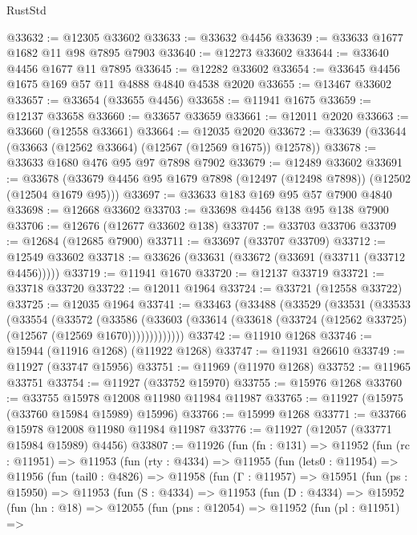 \begin{lexlean}{RustStd}
\begin{coremodule}
@33632 := @12305 @33602
@33633 := @33632 @4456
@33639 := @33633 @1677 @1682 @11 @98 @7895 @7903
@33640 := @12273 @33602
@33644 := @33640 @4456 @1677 @11 @7895
@33645 := @12282 @33602
@33654 := @33645 @4456 @1675 @169 @57 @11 @4888 @4840 @4538 @2020
@33655 := @13467 @33602
@33657 := @33654 (@33655 @4456)
@33658 := @11941 @1675
@33659 := @12137 @33658
@33660 := @33657 @33659
@33661 := @12011 @2020
@33663 := @33660 (@12558 @33661)
@33664 := @12035 @2020
@33672 := @33639 (@33644 (@33663 (@12562 @33664) (@12567 (@12569 @1675)) @12578))
@33678 := @33633 @1680 @476 @95 @97 @7898 @7902
@33679 := @12489 @33602
@33691 := @33678 (@33679 @4456 @95 @1679 @7898 (@12497 (@12498 @7898)) (@12502 (@12504 @1679 @95)))
@33697 := @33633 @183 @169 @95 @57 @7900 @4840
@33698 := @12668 @33602
@33703 := @33698 @4456 @138 @95 @138 @7900
@33706 := @12676 (@12677 @33602 @138)
@33707 := @33703 @33706
@33709 := @12684 (@12685 @7900)
@33711 := @33697 (@33707 @33709)
@33712 := @12549 @33602
@33718 := @33626 (@33631 (@33672 (@33691 (@33711 (@33712 @4456)))))
@33719 := @11941 @1670
@33720 := @12137 @33719
@33721 := @33718 @33720
@33722 := @12011 @1964
@33724 := @33721 (@12558 @33722)
@33725 := @12035 @1964
@33741 := @33463
    (@33488
      (@33529
        (@33531
          (@33533
            (@33554
              (@33572
                (@33586
                  (@33603 (@33614 (@33618 (@33724 (@12562 @33725) (@12567 (@12569 @1670)))))))))))))
@33742 := @11910 @1268
@33746 := @15944 (@11916 @1268) (@11922 @1268)
@33747 := @11931 @26610
@33749 := @11927 (@33747 @15956)
@33751 := @11969 (@11970 @1268)
@33752 := @11965 @33751
@33754 := @11927 (@33752 @15970)
@33755 := @15976 @1268
@33760 := @33755 @15978 @12008 @11980 @11984 @11987
@33765 := @11927 (@15975 (@33760 @15984 @15989) @15996)
@33766 := @15999 @1268
@33771 := @33766 @15978 @12008 @11980 @11984 @11987
@33776 := @11927 (@12057 (@33771 @15984 @15989) @4456)
@33807 := @11926
    (fun (fn : @131) =>
    @11952
      (fun (rc : @11951) =>
      @11953
        (fun (rty : @4334) =>
        @11955
          (fun (lets0 : @11954) =>
          @11956
            (fun (tail0 : @4826) =>
            @11958
              (fun (Γ : @11957) =>
              @15951
                (fun (ps : @15950) =>
                @11953
                  (fun (S : @4334) =>
                  @11953
                    (fun (D : @4334) =>
                    @15952
                      (fun (hn : @18) =>
                      @12055
                        (fun (pns : @12054) =>
                        @11952
                          (fun (pl : @11951) =>

\end{coremodule}
\end{lexlean}
